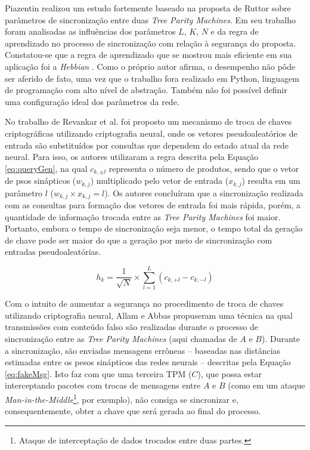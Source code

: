 \documentclass[a4paper,10pt,oneside,conference,final,keeplastbox]{inatel}
\begin{document}
        Piazentin \cite{piazentin2011troca} realizou um estudo fortemente baseado na proposta de Ruttor \cite{ruttor2007neural} sobre parâmetros de sincronização entre duas \textit{Tree Parity Machines}. Em seu trabalho foram analisadas as influências dos parâmetros $L$, $K$, $N$ e da regra de aprendizado no processo de sincronização com relação à segurança do proposta. Constatou-se que a regra de aprendizado que se mostrou mais eficiente em sua aplicação foi a \textit{Hebbian} \cite{hebb1949organization}. Como o próprio autor afirma, o desempenho não pôde ser aferido de fato, uma vez que o trabalho fora realizado em Python, linguagem de programação com alto nível de abstração. Também não foi possível definir uma configuração ideal dos parâmetros da rede.
    
        No trabalho de Revankar et al. \cite{revankar2010private} foi proposto um mecanismo de troca de chaves criptográficas utilizando criptografia neural, onde os vetores pseudoaleatórios de entrada são substituídos por consultas que dependem do estado atual da rede neural. Para isso, os autores utilizaram a regra descrita pela Equação \eqref{eq:queryGen}, na qual $c_{k, \pm l}$ representa o número de produtos, sendo que o vetor de psos sinápticos ($w_{k,j}$) multiplicado pelo vetor de entrada ($x_{k,j}$) resulta em um parâmetro $l$ ($w_{k,j} \times x_{k,j} = l$). Os autores concluíram que a sincronização realizada com as consultas para formação dos vetores de entrada foi mais rápida, porém, a quantidade de informação trocada entre as \textit{Tree Parity Machines} foi maior. Portanto, embora o tempo de sincronização seja menor, o tempo total da geração de chave pode ser maior do que a geração por meio de sincronização com entradas pseudoaleatórias.
        
        \begin{equation}
            \label{eq:queryGen}
            h_k = \frac{1}{\sqrt{N}} \times \displaystyle\sum_{l=1}^{L} (c_{k, +l} - c_{k, -l})
        \end{equation}

        Com o intuito de aumentar a segurança no procedimento de troca de chaves utilizando criptografia neural, Allam e Abbas \cite{allam2010improvement} propuseram uma técnica na qual transmissões com conteúdo falso são realizadas durante o processo de sincronização entre as \textit{Tree Parity Machines} (aqui chamadas de $A$ e $B$). Durante a sincronização, são enviadas mensagens errôneas -- baseadas nas distâncias estimadas entre os pesos sinápticos das redes neurais -- descritas pela Equação \eqref{eq:fakeMsg}. Isto faz com que uma terceira TPM ($C$), que possa estar interceptando pacotes com trocas de mensagens entre $A$ e $B$ (como em um ataque \textit{Man-in-the-Middle}\footnote{Ataque de interceptação de dados trocados entre duas partes.}, por exemplo), não consiga se sincronizar e, consequentemente, obter a chave que será gerada ao final do processo.
        
\end{document}
